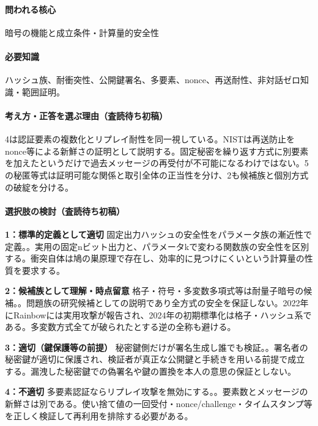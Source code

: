 \paragraph{問われる核心} 暗号の機能と成立条件・計算量的安全性

\paragraph{必要知識} ハッシュ族、耐衝突性、公開鍵署名、多要素、nonce、再送耐性、非対話ゼロ知識・範囲証明。

\paragraph{考え方・正答を選ぶ理由（査読待ち初稿）} 4は認証要素の複数化とリプレイ耐性を同一視している。NISTは再送防止をnonce等による新鮮さの証明として説明する。固定秘密を繰り返す方式に別要素を加えたというだけで過去メッセージの再受付が不可能になるわけではない。5の秘匿等式は証明可能な関係と取引全体の正当性を分け、2も候補族と個別方式の破綻を分ける。

\paragraph{選択肢の検討（査読待ち初稿）}\mbox{}\par

\noindent\textbf{1：標準的定義として適切} 固定出力ハッシュの安全性をパラメータ族の漸近性で定義。。実用の固定nビット出力と、パラメータkで変わる関数族の安全性を区別する。衝突自体は鳩の巣原理で存在し、効率的に見つけにくいという計算量の性質を要求する。\par

\noindent\textbf{2：候補族として理解・時点留意} 格子・符号・多変数多項式等は耐量子暗号の候補。。問題族の研究候補としての説明であり全方式の安全を保証しない。2022年にRainbowには実用攻撃が報告され、2024年の初期標準化は格子・ハッシュ系である。多変数方式全てが破られたとする逆の全称も避ける。\par

\noindent\textbf{3：適切（鍵保護等の前提）} 秘密鍵側だけが署名生成し誰でも検証。。署名者の秘密鍵が適切に保護され、検証者が真正な公開鍵と手続きを用いる前提で成立する。漏洩した秘密鍵での偽署名や鍵の置換を本人の意思の保証としない。\par

\noindent\textbf{4：不適切} 多要素認証ならリプレイ攻撃を無効にする。。要素数とメッセージの新鮮さは別である。使い捨て値の一回受付・nonce/challenge・タイムスタンプ等を正しく検証して再利用を排除する必要がある。\par


